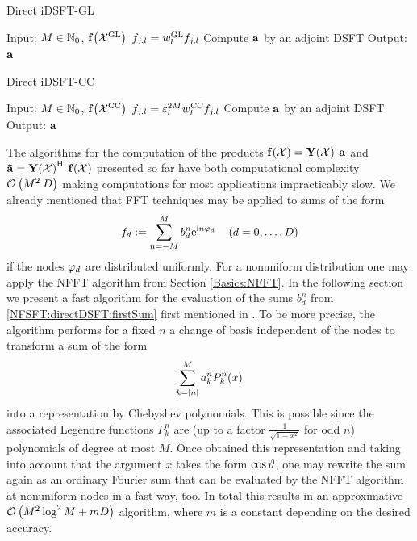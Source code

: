 \begin{algorithm}[htb]
  \caption{Direct iDSFT-GL}
  \label{NFSFT:directIDSFTGL}    
  \begin{algorithmic}
    \STATE Input: $M \in \mathbb{N}_{0}$, $\mathbf{f}{\hspace{-0.4ex}}\left(\mathcal{X}^{\mbox{\scriptsize\rm{GL}}}\right)$
    \STATE
        \STATE $f_{j,l} = w^{\mbox{\scriptsize\rm{GL}}}_{l} f_{j,l}$ 
      \ENDFOR
    \ENDFOR
    \STATE Compute $\mathbf{a}$ by an adjoint DSFT
    \STATE
    \STATE Output: $\mathbf{a}$
  \end{algorithmic}
\end{algorithm}
\begin{algorithm}[htb]
  \caption{Direct iDSFT-CC}
  \label{NFSFT:directIDSFTCC}    
  \begin{algorithmic}
    \STATE Input: $M \in \mathbb{N}_{0}$, $\mathbf{f}{\hspace{-0.4ex}}\left(\mathcal{X}^{\mbox{\scriptsize\rm{CC}}}\right)$
    \STATE
        \STATE $f_{j,l} = \varepsilon_{l}^{2M} w^{\mbox{\scriptsize\rm{CC}}}_{l} f_{j,l}$ 
      \ENDFOR
    \ENDFOR
    \STATE Compute $\mathbf{a}$ by an adjoint DSFT
    \STATE
    \STATE Output: $\mathbf{a}$
  \end{algorithmic}
\end{algorithm}

The algorithms for the computation of the products $\mathbf{f}{\hspace{-0.4ex}}\left(\mathcal{X}\right) = \mathbf{Y}{\hspace{-0.4ex}}\left(\mathcal{X}\right) \: \mathbf{a}$ and $\mathbf{\tilde{a}} = \mathbf{Y}{\hspace{-0.4ex}}\left(\mathcal{X}\right)^{\text{\rm{H}}} \: \mathbf{f}{\hspace{-0.4ex}}\left(\mathcal{X}\right)$ presented so far have both computational complexity $\mathcal{O}\left(M^2\:D\right)$ making computations for most applications impracticably slow. We already mentioned that FFT techniques may be applied to sums of the form
\[
  f_{d} := \sum_{n = -M}^M b^n_d \mbox{\rm{e}}^{\mbox{\scriptsize\rm{i}} n \varphi_{d}} \quad \left(d = 0,\ldots,D\right)
\]
if the nodes $\varphi_d$ are distributed uniformly. For a nonuniform distribution one may apply the NFFT algorithm from Section \ref{Basics:NFFT}. In the following section we present a fast algorithm for the evaluation of the sums $b^{n}_{d}$ from \eqref{NFSFT:directDSFT:firstSum} first mentioned in \cite{postta97}. To be more precise, the algorithm performs for a fixed $n$ a change of basis independent of the nodes to transform a sum of the form
\begin{equation}
  \label{NFSFT:LegendreSum}
  \sum_{k=\left\vert n\right\vert}^M a_{k}^n P_{k}^n{\hspace{-0.4ex}}\left(x\right)
\end{equation}
into a representation by Chebyshev polynomials. This is possible since the associated Legendre functions $P_{k}^n$ are (up to a factor $\frac{1}{\sqrt{1-x^2}}$ for odd $n$) polynomials of degree at most $M$. Once obtained this representation and taking into account that the argument $x$ takes the form $\cos \vartheta$, one may rewrite the sum again as an ordinary Fourier sum that can be evaluated by the NFFT algorithm at nonuniform nodes in a fast way, too. In total this results in an approximative $\mathcal{O}\left(M^2 \log^2 M + mD\right)$ algorithm, where $m$ is a constant depending on the desired accuracy. 

